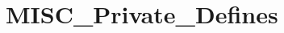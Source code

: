 \hypertarget{group___m_i_s_c___private___defines}{\section{M\-I\-S\-C\-\_\-\-Private\-\_\-\-Defines}
\label{group___m_i_s_c___private___defines}
}
